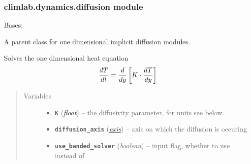 \documentclass[letterpaper,10pt,english]{sphinxmanual}
\begin{document}
\subsubsection{climlab.dynamics.diffusion module}
\label{api/climlab.dynamics:climlab-dynamics-diffusion-module}\label{api/climlab.dynamics:module-climlab.dynamics.diffusion}

\begin{fulllineitems}
\label{api/climlab.dynamics:climlab.dynamics.diffusion.Diffusion}
Bases: {\hyperref[api/climlab.process:climlab.process.implicit.ImplicitProcess]{\emph{}}}

A parent class for one dimensional implicit diffusion modules.

Solves the one dimensional heat equation
\begin{gather}
\begin{split}\frac{dT}{dt} = \frac{d}{dy} \left[ K \cdot \frac{dT}{dy} \right]\end{split}\notag
\end{gather}\begin{quote}\begin{description}
\item[{Variables}] \leavevmode\begin{itemize}
\item {} 
\textbf{\texttt{K}} (\href{http://docs.python.org/2.7/library/functions.html\#float}{\emph{float}}) -- the diffusivity parameter, for units see below.

\item {} 
\textbf{\texttt{diffusion\_axis}} ({\hyperref[api/climlab.domain:module-climlab.domain.axis]{\emph{\emph{axis}}}}) -- axis on which the diffusion is occuring

\item {} 
\textbf{\texttt{use\_banded\_solver}} (\emph{boolean}) -- input flag, whether to use 
\href{http://docs.scipy.org/doc/scipy/reference/generated/scipy.linalg.solve\_banded.html\#scipy.linalg.solve\_banded}{}
instead of \href{http://docs.scipy.org/doc/numpy/reference/generated/numpy.linalg.solve.html\#numpy.linalg.solve}{}


\end{itemize}
\end{description}
\end{quote}
\end{fulllineitems}
\end{document}
